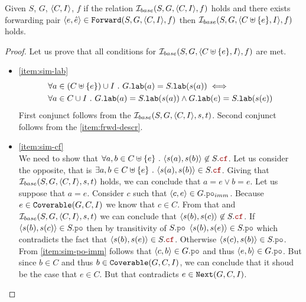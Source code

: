\documentclass[12pt]{article}
\begin{document}
\begin{lemma}
  \label{lemma:sim-forward}
  Given $S$, $G$, $\langle C, I \rangle$, $f$
  if the relation $\mathcal{I}_{base}(S, G, \langle C, I \rangle, f)$ holds and 
  there exists forwarding pair $\langle e, \hat{e} \rangle \in {\mathtt{Forward}}(S, G, \langle C, I \rangle, f)$
  then $\mathcal{I}_{base}(S, G, \langle C \uplus \{e\}, I \rangle, f)$ holds. 
\end{lemma}

\begin{proof}
  Let us prove that all conditions for $\mathcal{I}_{base}(S, G, \langle C \uplus \{e\}, I \rangle, f)$ are met.

  \begin{itemize}

  \item \ref{item:sim-lab} \\
    \begin{equation}
      \begin{split}
        & \forall{a \in (C \uplus \{e\}) \cup I} ~.~ G.{\mathtt{lab}}(a) = S.{\mathtt{lab}}(s(a)) \iff \\
        & \forall{a \in C \cup I} ~.~
          G.{\mathtt{lab}}(a) = S.{\mathtt{lab}}(s(a)) \wedge G.{\mathtt{lab}}(e) = S.{\mathtt{lab}}(s(e))
      \end{split}
    \end{equation}
    First conjunct follows from the $\mathcal{I}_{base}(S, G, \langle C, I \rangle, s, t)$.
    Second conjunct follows from the \ref{item:frwd-descr}.

  \item \ref{item:sim-cf} \\
    We need to show that
    $\forall{a, b \in C \uplus \{e\}} ~.~ \tup{s(a), s(b)} \not\in S.\lCF$.
    Let us consider the opposite, that is
    $\exists{a, b \in C \uplus \{e\}} ~.~ \tup{s(a), s(b)} \in S.\lCF$.
    Giving that $\mathcal{I}_{base}(S, G, \langle C, I \rangle, s, t)$ holds,
    we can conclude that \mbox{$a = e \vee b = e$}.
    Let us suppose that $a = e$.
    Consider $c$ such that $\tup{c, e} \in G.\lPO_{imm}$.
    Because $e \in {\mathtt{Coverable}}(G, C, I)$ we know that $c \in C$.
    From that and $\mathcal{I}_{base}(S, G, \langle C, I \rangle, s, t)$
    we can conclude that $\tup{s(b), s(c)} \not\in S.\lCF$.
    If $\tup{s(b), s(c)} \in S.\lPO$ then by transitivity of $S.\lPO$
    $\tup{s(b), s(e)} \in S.\lPO$
    which contradicts the fact that $\tup{s(b), s(e)} \in S.\lCF$.
    Otherwise \mbox{$\tup{s(c), s(b)} \in S.\lPO$}.
    From \ref{item:sim-po-imm} follows that $\tup{c, b} \in G.\lPO$
    and thus $\tup{e, b} \in G.\lPO$.
    But since $b \in C$ and thus $b \in {\mathtt{Coverable}}(G, C, I)$,
    we can conclude that it shoud be the case that $e \in C$.
    But that contradicts $e \in {\mathtt{Next}}(G, C, I)$.


\end{itemize}
\end{proof}
\end{document}
